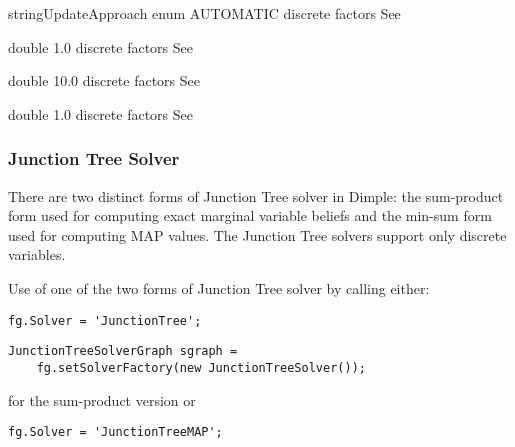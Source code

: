 
{\ifmatlab string\fi \ifjava UpdateApproach enum\fi}
{AUTOMATIC}
{discrete factors}
{See }


{double}
{1.0}
{discrete factors}
{See }


{double}
{10.0}
{discrete factors}
{See }


{double}
{1.0}
{discrete factors}
{See }

\clearpage
\subsubsection{Junction Tree Solver}
\label{sec:JunctionTreeSolverAPI}

There are two distinct forms of Junction Tree solver in Dimple: the sum-product form used for computing exact marginal variable beliefs and the min-sum form used for computing MAP values.  The Junction Tree solvers support only discrete variables.

Use of one of the two forms of Junction Tree solver by calling either:

\ifmatlab
\begin{lstlisting}
fg.Solver = 'JunctionTree';
\end{lstlisting}
\fi

\ifjava
\begin{lstlisting}
JunctionTreeSolverGraph sgraph =
    fg.setSolverFactory(new JunctionTreeSolver());
\end{lstlisting}
\fi

for the sum-product version or

\ifmatlab
\begin{lstlisting}
fg.Solver = 'JunctionTreeMAP';
\end{lstlisting}
\fi

